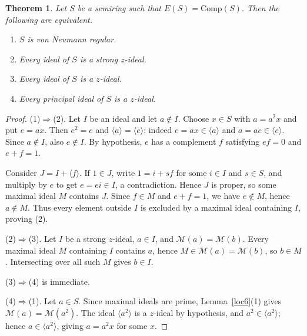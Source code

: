 \documentclass[10pt,a4paper]{amsart}
\newtheorem{theorem}{Theorem}
\newcommand{\M}{\mathcal M}
\newcommand{\ideal}[1]{\langle #1\rangle}
\begin{document}
\begin{theorem}\label{thm:regularity}
Let $S$ be a semiring such that $E(S)=\mathrm{Comp}(S)$.
Then the following are equivalent.
\begin{enumerate}
\item $S$ is von Neumann regular.
\item Every ideal of $S$ is a strong $z$-ideal.
\item Every ideal of $S$ is a $z$-ideal.
\item Every principal ideal of $S$ is a $z$-ideal.
\end{enumerate}
\end{theorem}

\begin{proof}
(1)$\Rightarrow$(2).
Let $I$ be an ideal and let $a\notin I$.
Choose $x\in S$ with $a=a^2x$ and put $e=ax$.
Then $e^2=e$ and $\ideal{a}=\ideal{e}$:
indeed $e=ax\in\ideal{a}$ and $a=ae\in\ideal{e}$.
Since $a\notin I$, also $e\notin I$.
By hypothesis, $e$ has a complement $f$
satisfying $ef=0$ and $e+f=1$.

Consider $J=I+\ideal{f}$.
If $1\in J$, write $1=i+sf$ for some $i\in I$ and $s\in S$,
and multiply by $e$ to get $e=ei\in I$, a contradiction.
Hence $J$ is proper, so some maximal ideal $M$ contains $J$.
Since $f\in M$ and $e+f=1$, we have $e\notin M$, hence $a\notin M$.
Thus every element outside $I$ is excluded by a maximal ideal
containing $I$, proving (2).

(2)$\Rightarrow$(3).
Let $I$ be a strong $z$-ideal, $a\in I$, and $\M(a)=\M(b)$.
Every maximal ideal $M$ containing $I$ contains $a$,
hence $M\in\M(a)=\M(b)$, so $b\in M$.
Intersecting over all such $M$ gives $b\in I$.

(3)$\Rightarrow$(4) is immediate.

(4)$\Rightarrow$(1).
Let $a\in S$.  Since maximal ideals are prime,
Lemma~\ref{loc6}(1) gives $\M(a)=\M(a^2)$.
The ideal $\ideal{a^2}$ is a $z$-ideal by hypothesis, and
$a^2\in\ideal{a^2}$; hence $a\in\ideal{a^2}$,
giving $a=a^2x$ for some $x$.
\end{proof}
\end{document}
